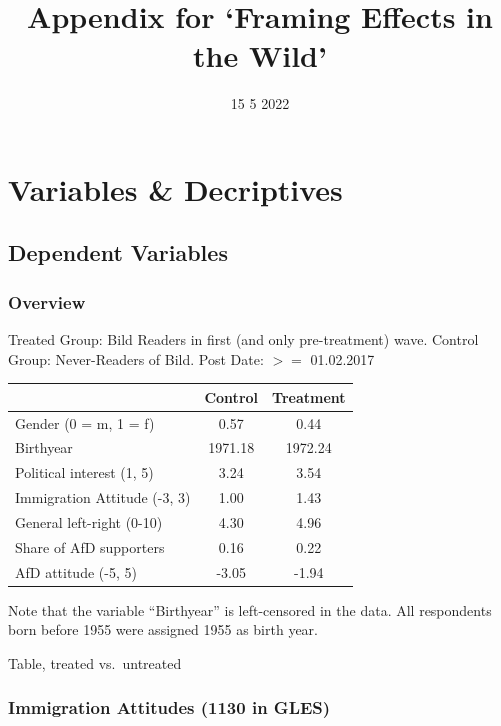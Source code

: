 \documentclass[
]{article}
\title{Appendix for `Framing Effects in the Wild'}
\author{}
\date{\vspace{-2.5em}15 5 2022}
\begin{document}
\maketitle

{
\setcounter{tocdepth}{2}
\tableofcontents
}
\hypertarget{variables-decriptives}{%
\section{Variables \& Decriptives}\label{variables-decriptives}}

\hypertarget{dependent-variables}{%
\subsection{Dependent Variables}\label{dependent-variables}}

\hypertarget{overview}{%
\subsubsection{Overview}\label{overview}}

Treated Group: Bild Readers in first (and only pre-treatment) wave. Control Group: Never-Readers of Bild. Post Date: \(>=\) 01.02.2017

\begin{tabular}{l|c|c}
\hline
  & Control & Treatment\\
\hline
Gender (0 = m, 1 = f) & 0.57 & 0.44\\
\hline
Birthyear & 1971.18 & 1972.24\\
\hline
Political interest (1, 5) & 3.24 & 3.54\\
\hline
Immigration Attitude (-3, 3) & 1.00 & 1.43\\
\hline
General left-right (0-10) & 4.30 & 4.96\\
\hline
Share of AfD supporters & 0.16 & 0.22\\
\hline
AfD attitude (-5, 5) & -3.05 & -1.94\\
\hline
\end{tabular}

Note that the variable ``Birthyear'' is left-censored in the data. All respondents born before 1955 were assigned 1955 as birth year.

Table, treated vs.~untreated

\hypertarget{immigration-attitudes-1130-in-gles}{%
\subsubsection{Immigration Attitudes (1130 in GLES)}\label{immigration-attitudes-1130-in-gles}}
\end{document}
